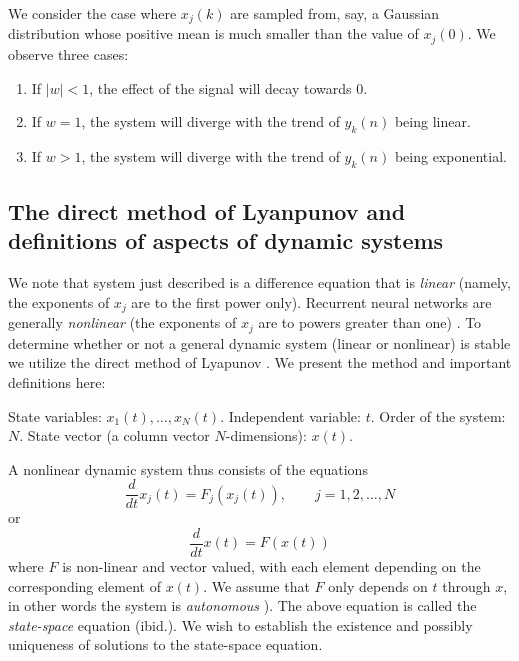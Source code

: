 We consider the case where $x_j(k)$ are sampled from, say, a Gaussian distribution whose positive mean is much smaller than the value of $x_j(0)$. We observe three cases:

\begin{enumerate}
\item If $|w| < 1$, the effect of the signal will decay towards $0$.
\item If $w = 1$, the system will diverge with the trend of $y_k(n)$ being linear. 
\item If $w > 1$, the system will diverge with the trend of $y_k(n)$ being exponential.  
\end{enumerate}

\subsection{The direct method of Lyanpunov and definitions of aspects of dynamic systems}

We note that system just described is a difference equation that is \emph{linear} (namely, the exponents of $x_j$ are to the first power only). Recurrent neural networks are generally \emph{nonlinear} (the exponents of $x_j$ are to powers greater than one) \cite[p. 6]{strogatz:2000}. To determine whether or not a general dynamic system (linear or nonlinear) is stable we utilize the direct method of Lyapunov \cite[p. 674]{Haykin:2009:NNC:1213811}. We present the method and important definitions here:

\begin{definition}
  State variables: $x_1(t), \ldots, x_N(t)$. Independent variable: $t$. Order of the system: $N$. State vector (a column vector $N$-dimensions): $x(t)$.
\end{definition}

A nonlinear dynamic system thus consists of the equations
%
\begin{equation*}
  \frac{d}{dt}x_j(t) = F_j \left(x_j(t)\right), \qquad j = 1, 2, \ldots, N
\end{equation*}
%
or
%
\begin{equation*}
  \frac{d}{dt}x(t) = F \left(x(t)\right)
\end{equation*}
%
where $F$ is non-linear and vector valued, with each element depending on the corresponding element of $x(t)$. We assume that $F$ only depends on $t$ through $x$, in other words the system is \emph{autonomous} \cite[p. 675]{Haykin:2009:NNC:1213811}). The above equation is called the \emph{state-space} equation (ibid.). We wish to establish the existence and possibly uniqueness of solutions to the state-space equation.

